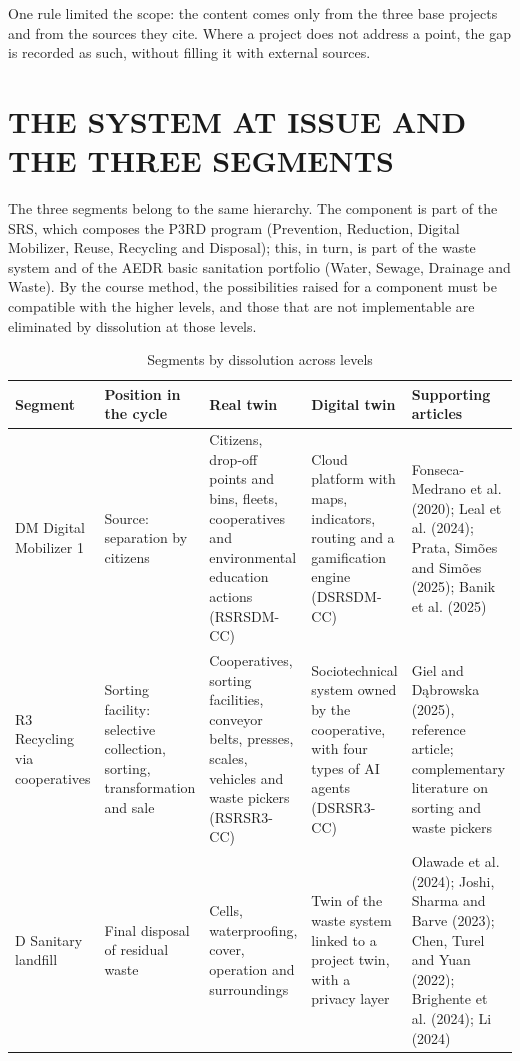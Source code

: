 \documentclass[12pt,a4paper,article,oneside,brazil,english]{abntex2}
\newcommand{\fontetab}[1]{\par\vspace{3pt}{\small\noindent Source: #1\par}}
\begin{document}
One rule limited the scope: the content comes only from the three base projects and from the sources they cite. Where a project does not address a point, the gap is recorded as such, without filling it with external sources.

\section{THE SYSTEM AT ISSUE AND THE THREE SEGMENTS}

The three segments belong to the same hierarchy. The component is part of the SRS, which composes the P3RD program (Prevention, Reduction, Digital Mobilizer, Reuse, Recycling and Disposal); this, in turn, is part of the waste system and of the AEDR basic sanitation portfolio (Water, Sewage, Drainage and Waste). By the course method, the possibilities raised for a component must be compatible with the higher levels, and those that are not implementable are eliminated by dissolution at those levels.

\begin{table}[!htbp]
\centering
\caption{Segments by dissolution across levels}
\label{tab:segmentos}
\footnotesize
\begin{tabularx}{\linewidth}{>{\raggedright\arraybackslash}p{2.3cm} >{\raggedright\arraybackslash}p{2.2cm} Y Y Y}
\hline
\textbf{Segment} & \textbf{Position in the cycle} & \textbf{Real twin} & \textbf{Digital twin} & \textbf{Supporting articles}\\
\hline
DM \textperiodcentered{} Digital Mobilizer 1 & Source: separation by citizens & Citizens, drop-off points and bins, fleets, cooperatives and environmental education actions (RSRSDM-CC) & Cloud platform with maps, indicators, routing and a gamification engine (DSRSDM-CC) & Fonseca-Medrano et al. (2020); Leal et al. (2024); Prata, Simões and Simões (2025); Banik et al. (2025)\\
R3 \textperiodcentered{} Recycling via cooperatives & Sorting facility: selective collection, sorting, transformation and sale & Cooperatives, sorting facilities, conveyor belts, presses, scales, vehicles and waste pickers (RSRSR3-CC) & Sociotechnical system owned by the cooperative, with four types of AI agents (DSRSR3-CC) & Giel and Dąbrowska (2025), reference article; complementary literature on sorting and waste pickers\\
D \textperiodcentered{} Sanitary landfill & Final disposal of residual waste & Cells, waterproofing, cover, operation and surroundings & Twin of the waste system linked to a project twin, with a privacy layer & Olawade et al. (2024); Joshi, Sharma and Barve (2023); Chen, Turel and Yuan (2022); Brighente et al. (2024); Li (2024)\\
\hline
\end{tabularx}
\fontetab{Prepared by the author (2026).}
\end{table}
\end{document}
